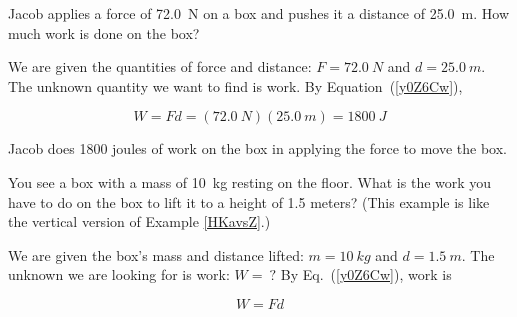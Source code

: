 \documentclass[main.tex]{subfiles}
\begin{document}
\begin{example} \label{HKavsZ}
Jacob applies a force of \SI{72.0}{N} on a box and pushes it a distance of \SI{25.0}{m}. How much work is done on the box?
\end{example}

\begin{center}
\end{center}

\Solution We are given the quantities of force and distance: $F = \SI{72.0}{N}$ and $d = \SI{25.0}{m}$. The unknown quantity we want to find is work. By Equation~(\ref{y0Z6Cw}), 

\begin{equation*}
    W = F d = \left(\SI{72.0}{N}\right)\left(\SI{25.0}{m}\right) = \SI{1800}{J}
\end{equation*}

Jacob does 1800 joules of work on the box in applying the force to move the box.

\cyanhrule

\begin{example} \label{O9RxyJ}
You see a box with a mass of \SI{10}{kg} resting on the floor. What is the work you have to do on the box to lift it to a height of 1.5 meters? (This example is like the vertical version of Example \ref{HKavsZ}.)
\end{example} 


\Solution We are given the box's mass and distance lifted: $m = \SI{10}{kg}$ and $d = \SI{1.5}{m}$. The unknown we are looking for is work: $W =\ ?$ By Eq.~(\ref{y0Z6Cw}), work is

\begin{equation*}
    W = F d
\end{equation*}
\end{document}
